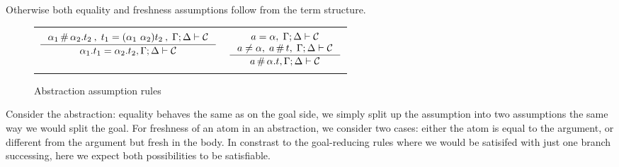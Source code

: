 \documentclass[english, mgr]{iithesis}
\newcommand{\solverRule}{\vdash}
\begin{document}
Otherwise both equality and freshness assumptions follow from the term structure.
\begin{figure}[htpb]
  \centering
  \begin{tabularx}{\textwidth}{|CC|}
  \hline & \\ $
  \inference{
    \atomexp_1 \cfresh \tbind{\atomexp_2} \term_2\:,\;
      \term_1 = \permswap{\atomexp_1}{\atomexp_2}\term_2 \:, \;
      \cEnv ; \icEnv \solverRule \sconstr
  }{
    \tbind{\atomexp_1} \term_1 \ceq \tbind{\atomexp_2} \term_2 , \cEnv ; \icEnv \solverRule \sconstr
  } $ & $
  \inference{
    \atomv \ceq \atomexp, \; \cEnv ; \icEnv \solverRule \sconstr
    \\
    \atomv \cneq \atomexp, \; \atomv \cfresh \term,\;\cEnv ; \icEnv \solverRule \sconstr
  }{
    \atomv \cfresh \tbind{\atomexp} \term , \cEnv ; \icEnv \solverRule \sconstr
  } $ \\ & \\ \hline
  \end{tabularx}
  \caption{Abstraction assumption rules}
  \label{fig:abstraction}
\end{figure}
Consider the abstraction: equality behaves the same as on the goal side, we simply
split up the assumption into two assumptions the same way we would split the goal.
For freshness of an atom in an abstraction, we consider two cases:
either the atom is equal to the argument,
or different from the argument but fresh in the body.
In constrast to the goal-reducing rules where we would be satisifed with
just one branch successing, here we expect both possibilities to be satisfiable.
\end{document}
